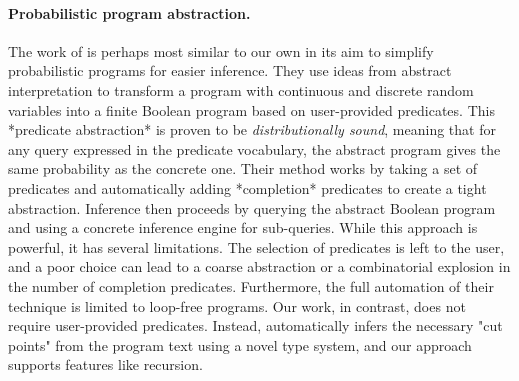 \paragraph{Probabilistic program abstraction.}
The work of \cite{Holtzen2018Abstraction} is perhaps most similar to our own in its aim to simplify probabilistic programs for easier inference.
They use ideas from abstract interpretation to transform a program with continuous and discrete random variables into a finite Boolean program based on user-provided predicates.
This *predicate abstraction* is proven to be \emph{distributionally sound}, meaning that for any query expressed in the predicate vocabulary, the abstract program gives the same probability as the concrete one.
Their method works by taking a set of predicates and automatically adding *completion* predicates to create a tight abstraction.
Inference then proceeds by querying the abstract Boolean program and using a concrete inference engine for sub-queries.
While this approach is powerful, it has several limitations.
The selection of predicates is left to the user, and a poor choice can lead to a coarse abstraction or a combinatorial explosion in the number of completion predicates.
Furthermore, the full automation of their technique is limited to loop-free programs.
Our work, in contrast, does not require user-provided predicates. Instead, \Slice{} automatically infers the necessary "cut points" from the program text using a novel type system, and our approach supports features like recursion.

